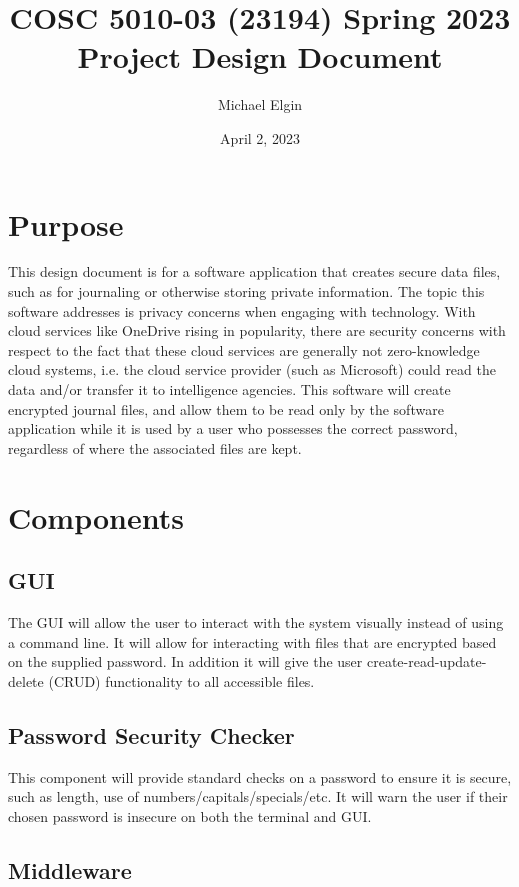 \documentclass[12pt, letterpaper]{article}
\title{COSC 5010-03 (23194) Spring 2023 Project Design Document}
\author{Michael Elgin}
\date{April 2, 2023}
\begin{document}
\maketitle

\section{Purpose}

This design document is for a software application that creates secure data files, such as for journaling or otherwise storing private information. The topic this software addresses is privacy concerns when engaging with technology. With cloud services like OneDrive rising in popularity, there are security concerns with respect to the fact that these cloud services are generally not zero-knowledge cloud systems, i.e. the cloud service provider (such as Microsoft) could read the data and/or transfer it to intelligence agencies. This software will create encrypted journal files, and allow them to be read only by the software application while it is used by a user who possesses the correct password, regardless of where the associated files are kept.

\section{Components}
\subsection{GUI}

The GUI will allow the user to interact with the system visually instead of using a command line. It will allow for interacting with files that are encrypted based on the supplied password. In addition it will give the user create-read-update-delete (CRUD) functionality to all accessible files.

\subsection{Password Security Checker}

This component will provide standard checks on a password to ensure it is secure, such as length, use of numbers/capitals/specials/etc. It will warn the user if their chosen password is insecure on both the terminal and GUI.

\subsection{Middleware}
\end{document}
